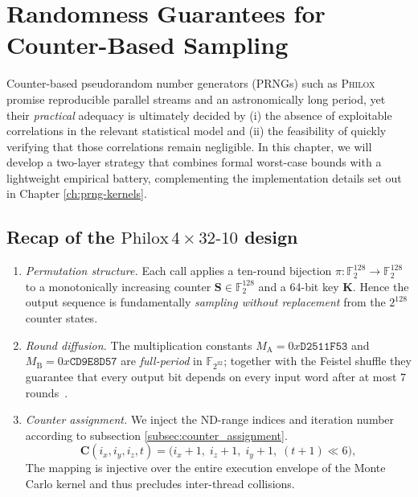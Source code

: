 \chapter{Randomness Guarantees for Counter-Based Sampling}
\label{chap:philox-quality}
Counter-based pseudorandom number generators (PRNGs) such as
  \textsc{Philox} promise reproducible parallel streams and an
  astronomically long period, yet their \emph{practical} adequacy is
  ultimately decided by (i) the absence of exploitable correlations in
  the relevant statistical model and (ii) the feasibility of quickly
  verifying that those correlations remain negligible.  In this chapter, we will develop a
  two-layer strategy that combines formal worst-case bounds with a
  lightweight empirical battery, complementing the
  implementation details set out in Chapter \ref{ch:prng-kernels}.

\section{Recap of the \texorpdfstring{\({\text{Philox}\,4\times32\text{-}10}\)}{Philox-4×32-10} design}
\begin{enumerate}[label=(\roman*)]
  \item \emph{Permutation structure.}  Each call applies a
        ten-round bijection
        \(\pi\colon\mathbb{F}_2^{128}\to\mathbb{F}_2^{128}\)
        to a monotonically increasing counter
        \(\mathbf{S}\in\mathbb{F}_2^{128}\) and a
        64-bit key \(\mathbf{K}\).  Hence the output sequence is
        fundamentally \emph{sampling without replacement} from the
        \(2^{128}\) counter states.

  \item \emph{Round diffusion.}  The multiplication constants
        \(M_{\mathrm A}=0x\texttt{D2511F53}\) and
        \(M_{\mathrm B}=0x\texttt{CD9E8D57}\) are \emph{full-period}
        in \(\mathbb{F}_{2^{32}}\); together with the Feistel shuffle they
        guarantee that every output bit depends on every input word
        after at most \(7\) rounds~\cite{Salmon2011Random123}.

  \item \emph{Counter assignment.}  We inject the ND-range indices and
        iteration number according to subsection \ref{subsec:counter_assignment}. 
        \[
          \mathbf{C}(i_x,i_y,i_z,t)
          =\bigl(i_x+1,\;i_z+1,\;i_y+1,\;(t+1)\ll6\bigr),
        \]
 The mapping is
        injective over the entire execution envelope of the Monte
        Carlo kernel and thus precludes inter-thread collisions.
\end{enumerate}

